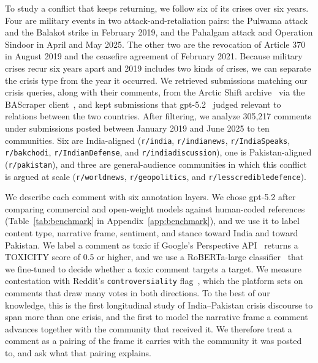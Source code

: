 To study a conflict that keeps returning, we follow six of its crises over six years. Four are military events in two attack-and-retaliation pairs: the Pulwama attack and the Balakot strike in February 2019, and the Pahalgam attack and Operation Sindoor in April and May 2025. The other two are the revocation of Article 370 in August 2019 and the ceasefire agreement of February 2021. Because military crises recur six years apart and 2019 includes two kinds of crises, we can separate the crisis type from the year it occurred. We retrieved submissions matching our crisis queries, along with their comments, from the Arctic Shift archive~\cite{arcticshift2026software} via the BAScraper client~\cite{bascraper2026software}, and kept submissions that gpt-5.2~\cite{openai2025gpt52} judged relevant to relations between the two countries. After filtering, we analyze 305,217 comments under submissions posted between January 2019 and June 2025 to ten communities. Six are India-aligned (\texttt{r/india}, \texttt{r/indianews}, \texttt{r/IndiaSpeaks}, \texttt{r/bakchodi}, \texttt{r/IndianDefense}, and \texttt{r/indiadiscussion}), one is Pakistan-aligned (\texttt{r/pakistan}), and three are general-audience communities in which this conflict is argued at scale (\texttt{r/worldnews}, \texttt{r/geopolitics}, and \texttt{r/lesscredibledefence}).

We describe each comment with six annotation layers. We chose gpt-5.2 after comparing commercial and open-weight models against human-coded references (Table~\ref{tab:benchmark} in Appendix~\ref{app:benchmark}), and we use it to label content type, narrative frame, sentiment, and stance toward India and toward Pakistan. We label a comment as toxic if Google's Perspective API~\cite{jigsaw2018perspective} returns a TOXICITY score of 0.5 or higher, and we use a RoBERTa-large classifier~\cite{liu2019roberta} that we fine-tuned to decide whether a toxic comment targets a target. We measure contestation with Reddit's \texttt{controversiality} flag~\cite{reddit2017source}, which the platform sets on comments that draw many votes in both directions. To the best of our knowledge, this is the first longitudinal study of India--Pakistan crisis discourse to span more than one crisis, and the first to model the narrative frame a comment advances together with the community that received it. We therefore treat a comment as a pairing of the frame it carries with the community it was posted to, and ask what that pairing explains.

